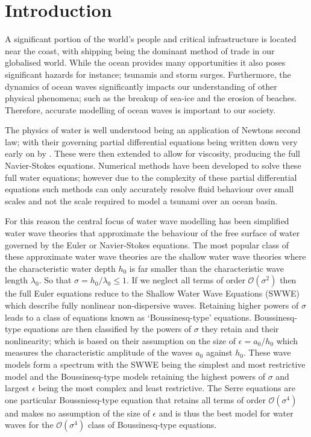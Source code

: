 
\chapter{Introduction}
\label{chp:Introduction}





A significant portion of the world's people and critical infrastructure is located near the coast, with shipping being the dominant method of trade in our globalised world. While the ocean provides many opportunities it also poses significant hazards for instance; tsunamis and storm surges. Furthermore, the dynamics of ocean waves significantly impacts our understanding of other physical phenomena; such as the breakup of sea-ice and the erosion of beaches. Therefore, accurate modelling of ocean waves is important to our society. 

The physics of water is well understood being an application of Newtons second law; with their governing partial differential equations being written down very early on by \citet{Euler-1755-274}. These were then extended to allow for viscosity, producing the full Navier-Stokes equations. Numerical methods \cite{Chorin-1967-928,Taylor-Hood-1973-73,Bassi-1997-267} have been developed to solve these full water equations; however due to the complexity of these partial differential equations such methods can only accurately resolve fluid behaviour over small scales and not the scale required to model a tsunami over an ocean basin. 

For this reason the central focus of water wave modelling has been simplified water wave theories that approximate the behaviour of the free surface of water governed by the Euler or Navier-Stokes equations. The most popular class of these approximate water wave theories are the shallow water wave theories where the characteristic water depth $h_0$ is far smaller than the characteristic wave length $\lambda_0$. So that $\sigma = h_0 / \lambda_0 \le 1$. If we neglect all terms of order $\mathcal{O}\left(\sigma ^2\right)$ then the full Euler equations reduce to the Shallow Water Wave Equations (SWWE) which describe fully nonlinear non-dispersive waves. Retaining higher powers of $\sigma$ leads to a class of equations known as `Boussinesq-type' equations. Boussinesq-type equations are then classified by the powers of $\sigma$ they retain and their nonlinearity; which is based on their assumption on the size of $\epsilon= a_0 / h_0$ which measures the characteristic amplitude of the waves $a_0$ against $h_0$. These wave models form a spectrum with the SWWE being the simplest and most restrictive model and the Boussinesq-type models retaining the highest powers of $\sigma$ and largest $\epsilon$ being the most complex and least restrictive. The Serre equations are one particular Boussniesq-type equation that retains all terms of order $\mathcal{O}\left(\sigma ^4\right)$ and makes no assumption of the size of $\epsilon$ and is thus the best model for water waves for the $\mathcal{O}\left(\sigma ^4\right)$ class of Boussinesq-type equations. 

